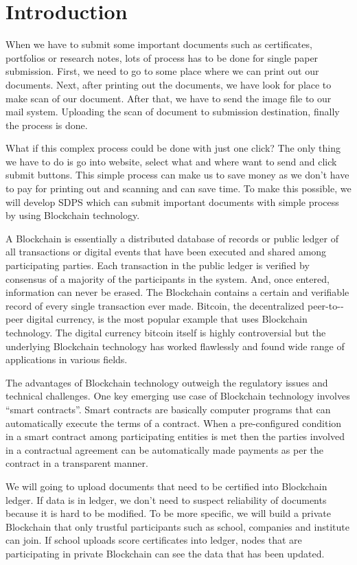\documentclass[conference]{IEEEtran}
\begin{document}
\section{Introduction}
When we have to submit some important documents such as certificates, portfolios or research notes, lots of process has to be done for single paper submission. First, we need to go to some place where we can print out our documents. Next, after printing out the documents, we have look for place to make scan of our document. After that, we have to send the image file to our mail system. Uploading the scan of document to submission destination, finally the process is done. 

What if this complex process could be done with just one click? The only thing we have to do is go into website, select what and where want to send and click submit buttons. This simple process can make us to save money as we don’t have to pay for printing out and scanning and can save time. To make this possible, we will develop SDPS which can submit important documents with simple process by using Blockchain technology. 

 A Blockchain is essentially a distributed database of records or public ledger of all transactions or
digital events that have been executed and shared among participating parties. Each transaction in the public ledger is verified by consensus of a majority of the participants in the system. And, once entered, information can never be erased. The Blockchain contains a certain and verifiable record of every single transaction ever made. Bitcoin, the decentralized peer­-to-­peer digital currency, is the most popular example that uses Blockchain technology. The digital currency bitcoin itself is highly controversial but the underlying Blockchain technology has worked flawlessly and found wide range of applications in various fields.

The advantages of Blockchain technology outweigh the regulatory issues and technical challenges. One key emerging use case of Blockchain technology involves “smart contracts”. Smart contracts are basically computer programs that can automatically execute the terms of a contract. When a pre-configured condition in a smart contract among participating entities is met then the parties involved in a contractual agreement can be automatically made payments as per the contract in a transparent manner.

We will going to upload documents that need to be certified into Blockchain ledger. If data is in ledger, we don’t need to suspect reliability of documents because it is hard to be modified. To be more specific, we will build a private Blockchain that only trustful participants such as school, companies and institute can join. If school uploads score certificates into ledger, nodes that are participating in private Blockchain can see the data that has been updated. 
\end{document}
